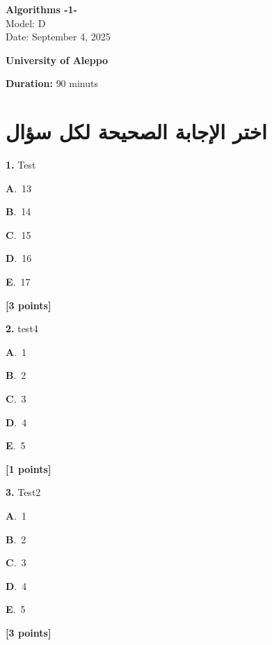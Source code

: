\documentclass[12pt]{article}
\newcommand{\choice}[3]{%
  \noindent\textbf{#1}.~#2\hfill#3\par\vspace{0.25em}
}
\begin{document}
\begin{flushright}
{\Large \textbf{{\textenglish{Algorithms -1-}}}}\\[0.25em]
{\normalsize \textenglish{Model: }{\textenglish{D}}}\\[0.1em]
{\normalsize \textenglish{Date: }{\textenglish{September 4, 2025}}}
\end{flushright}

\vspace{0.6cm}

\noindent
\begin{minipage}[t]{0.65\textwidth}
  \raggedright
  \textbf{{\textenglish{University of Aleppo}}}\\[0.3em]
\end{minipage}\hfill
\begin{minipage}[t]{0.3\textwidth}
  \raggedleft
  \textenglish{\textbf{Duration: }}{\textenglish{90 minuts}}
\end{minipage}

\vspace{0.9cm}

\section*{اختر الإجابة الصحيحة لكل سؤال}

\noindent \textbf{\textenglish{1.}} {\textenglish{Test}}

\noindent\choice{A}{{\textenglish{13}}}{}
\noindent\choice{B}{{\textenglish{14}}}{}
\noindent\choice{C}{{\textenglish{15}}}{}
\noindent\choice{D}{{\textenglish{16}}}{}
\noindent\choice{E}{{\textenglish{17}}}{}
\hfill \textbf{[3 points]}\vspace{0.5em}

\noindent \textbf{\textenglish{2.}} {\textenglish{test4}}

\noindent\choice{A}{{\textenglish{1}}}{}
\noindent\choice{B}{{\textenglish{2}}}{}
\noindent\choice{C}{{\textenglish{3}}}{}
\noindent\choice{D}{{\textenglish{4}}}{}
\noindent\choice{E}{{\textenglish{5}}}{}
\hfill \textbf{[1 points]}\vspace{0.5em}

\noindent \textbf{\textenglish{3.}} {\textenglish{Test2}}

\noindent\choice{A}{{\textenglish{1}}}{}
\noindent\choice{B}{{\textenglish{2}}}{}
\noindent\choice{C}{{\textenglish{3}}}{}
\noindent\choice{D}{{\textenglish{4}}}{}
\noindent\choice{E}{{\textenglish{5}}}{}
\hfill \textbf{[3 points]}\vspace{0.5em}
\end{document}
